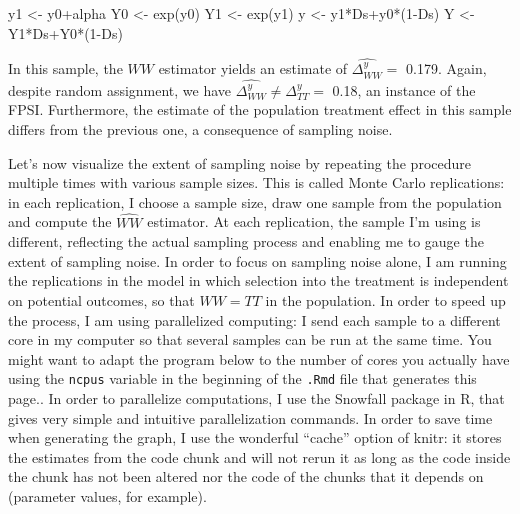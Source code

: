 \documentclass[
]{book}
\newenvironment{Shaded}{\begin{snugshade}}{\end{snugshade}}
\newcommand{\DecValTok}[1]{\textcolor[rgb]{0.00,0.00,0.81}{#1}}
\newcommand{\FunctionTok}[1]{\textcolor[rgb]{0.00,0.00,0.00}{#1}}
\newcommand{\NormalTok}[1]{#1}
\newcommand{\OtherTok}[1]{\textcolor[rgb]{0.56,0.35,0.01}{#1}}
\newcommand{\SpecialCharTok}[1]{\textcolor[rgb]{0.00,0.00,0.00}{#1}}
\theoremstyle{definition}
\theoremstyle{definition}
\theoremstyle{definition}
\theoremstyle{definition}
\theoremstyle{remark}
\begin{document}
\begin{Shaded}
\begin{Highlighting}[]
\NormalTok{y1 }\OtherTok{\textless{}{-}}\NormalTok{ y0}\SpecialCharTok{+}\NormalTok{alpha}
\NormalTok{Y0 }\OtherTok{\textless{}{-}} \FunctionTok{exp}\NormalTok{(y0)}
\NormalTok{Y1 }\OtherTok{\textless{}{-}} \FunctionTok{exp}\NormalTok{(y1)}
\NormalTok{y }\OtherTok{\textless{}{-}}\NormalTok{ y1}\SpecialCharTok{*}\NormalTok{Ds}\SpecialCharTok{+}\NormalTok{y0}\SpecialCharTok{*}\NormalTok{(}\DecValTok{1}\SpecialCharTok{{-}}\NormalTok{Ds)}
\NormalTok{Y }\OtherTok{\textless{}{-}}\NormalTok{ Y1}\SpecialCharTok{*}\NormalTok{Ds}\SpecialCharTok{+}\NormalTok{Y0}\SpecialCharTok{*}\NormalTok{(}\DecValTok{1}\SpecialCharTok{{-}}\NormalTok{Ds)}
\end{Highlighting}
\end{Shaded}

In this sample, the \(WW\) estimator yields an estimate of \(\hat{\Delta^y_{WW}}=\) 0.179.
Again, despite random assignment, we have \(\hat{\Delta^y_{WW}}\neq\Delta^y_{TT}=\) 0.18, an instance of the FPSI.
Furthermore, the estimate of the population treatment effect in this sample differs from the previous one, a consequence of sampling noise.

Let's now visualize the extent of sampling noise by repeating the procedure multiple times with various sample sizes.
This is called Monte Carlo replications: in each replication, I choose a sample size, draw one sample from the population and compute the \(\hat{WW}\) estimator.
At each replication, the sample I'm using is different, reflecting the actual sampling process and enabling me to gauge the extent of sampling noise.
In order to focus on sampling noise alone, I am running the replications in the model in which selection into the treatment is independent on potential outcomes, so that \(WW=TT\) in the population.
In order to speed up the process, I am using parallelized computing: I send each sample to a different core in my computer so that several samples can be run at the same time.
You might want to adapt the program below to the number of cores you actually have using the \texttt{ncpus} variable in the beginning of the \texttt{.Rmd} file that generates this page..
In order to parallelize computations, I use the Snowfall package in R, that gives very simple and intuitive parallelization commands.
In order to save time when generating the graph, I use the wonderful ``cache'' option of knitr: it stores the estimates from the code chunk and will not rerun it as long as the code inside the chunk has not been altered nor the code of the chunks that it depends on (parameter values, for example).
\end{document}
